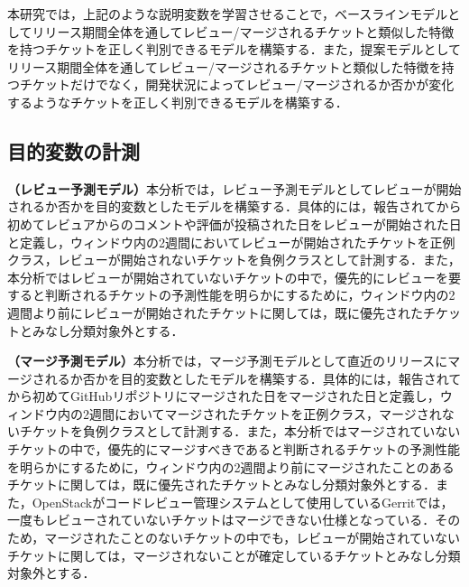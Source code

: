 \documentclass[submit]{ipsj}
\begin{document}
本研究では，上記のような説明変数を学習させることで，ベースラインモデルとしてリリース期間全体を通してレビュー/マージされるチケットと類似した特徴を持つチケットを正しく判別できるモデルを構築する．また，提案モデルとしてリリース期間全体を通してレビュー/マージされるチケットと類似した特徴を持つチケットだけでなく，開発状況によってレビュー/マージされるか否かが変化するようなチケットを正しく判別できるモデルを構築する．

\begin{table}[h]
  \caption{説明変数として計測する開発状況}
  \label{table:metrics_kaihatujoukyou}
  \centering
  \vspace{0.5zh}
\end{table}

\subsection{目的変数の計測}
\textbf{（レビュー予測モデル）}本分析では，レビュー予測モデルとしてレビューが開始されるか否かを目的変数としたモデルを構築する．具体的には，報告されてから初めてレビュアからのコメントや評価が投稿された日をレビューが開始された日と定義し，ウィンドウ内の2週間においてレビューが開始されたチケットを正例クラス，レビューが開始されないチケットを負例クラスとして計測する．また，本分析ではレビューが開始されていないチケットの中で，優先的にレビューを要すると判断されるチケットの予測性能を明らかにするために，ウィンドウ内の2週間より前にレビューが開始されたチケットに関しては，既に優先されたチケットとみなし分類対象外とする．

\textbf{（マージ予測モデル）}本分析では，マージ予測モデルとして直近のリリースにマージされるか否かを目的変数としたモデルを構築する．具体的には，報告されてから初めてGitHubリポジトリにマージされた日をマージされた日と定義し，ウィンドウ内の2週間においてマージされたチケットを正例クラス，マージされないチケットを負例クラスとして計測する．また，本分析ではマージされていないチケットの中で，優先的にマージすべきであると判断されるチケットの予測性能を明らかにするために，ウィンドウ内の2週間より前にマージされたことのあるチケットに関しては，既に優先されたチケットとみなし分類対象外とする．また，OpenStackがコードレビュー管理システムとして使用しているGerritでは，一度もレビューされていないチケットはマージできない仕様となっている．そのため，マージされたことのないチケットの中でも，レビューが開始されていないチケットに関しては，マージされないことが確定しているチケットとみなし分類対象外とする．
\end{document}
